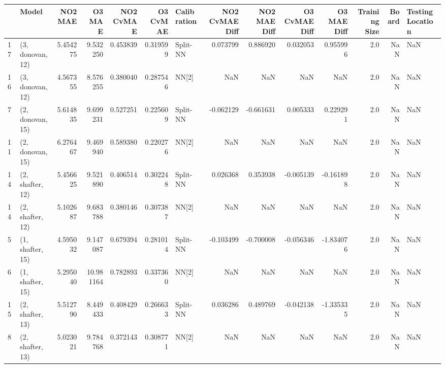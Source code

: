 \begin{tabular}{llrrrrlrrrrrrl}
\toprule
{} &             Model &   NO2 MAE &     O3 MAE &  NO2 CvMAE &  O3 CvMAE & Calibration &  NO2 CvMAE Diff &  NO2 MAE Diff &  O3 CvMAE Diff &  O3 MAE Diff &  Training Size &  Board & Testing Location \\
\midrule
17 &  (3, donovan, 12) &  5.454275 &   9.532250 &   0.453839 &  0.319599 &    Split-NN &        0.073799 &      0.886920 &       0.032053 &     0.955996 &            2.0 &    NaN &              NaN \\
16 &  (3, donovan, 12) &  4.567355 &   8.576255 &   0.380040 &  0.287546 &       NN[2] &             NaN &           NaN &            NaN &          NaN &            2.0 &    NaN &              NaN \\
7  &  (2, donovan, 15) &  5.614835 &   9.699231 &   0.527251 &  0.225609 &    Split-NN &       -0.062129 &     -0.661631 &       0.005333 &     0.229291 &            2.0 &    NaN &              NaN \\
11 &  (2, donovan, 15) &  6.276467 &   9.469940 &   0.589380 &  0.220276 &       NN[2] &             NaN &           NaN &            NaN &          NaN &            2.0 &    NaN &              NaN \\
14 &  (2, shafter, 12) &  5.456625 &   9.521890 &   0.406514 &  0.302248 &    Split-NN &        0.026368 &      0.353938 &      -0.005139 &    -0.161898 &            2.0 &    NaN &              NaN \\
14 &  (2, shafter, 12) &  5.102687 &   9.683788 &   0.380146 &  0.307387 &       NN[2] &             NaN &           NaN &            NaN &          NaN &            2.0 &    NaN &              NaN \\
5  &  (1, shafter, 15) &  4.595032 &   9.147087 &   0.679394 &  0.281014 &    Split-NN &       -0.103499 &     -0.700008 &      -0.056346 &    -1.834076 &            2.0 &    NaN &              NaN \\
6  &  (1, shafter, 15) &  5.295040 &  10.981164 &   0.782893 &  0.337360 &       NN[2] &             NaN &           NaN &            NaN &          NaN &            2.0 &    NaN &              NaN \\
15 &  (2, shafter, 13) &  5.512790 &   8.449433 &   0.408429 &  0.266633 &    Split-NN &        0.036286 &      0.489769 &      -0.042138 &    -1.335335 &            2.0 &    NaN &              NaN \\
8  &  (2, shafter, 13) &  5.023021 &   9.784768 &   0.372143 &  0.308771 &       NN[2] &             NaN &           NaN &            NaN &          NaN &            2.0 &    NaN &              NaN \\

\end{tabular}
